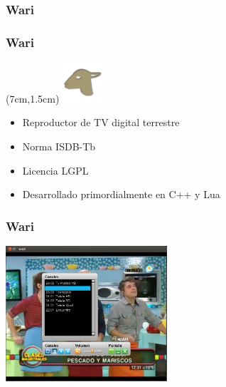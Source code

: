 \documentclass[a4paper,11pt]{beamer}
\begin{document}
		\subsubsection{Wari}
			\begin{frame}
				\frametitle{Wari}
				\begin{textblock*}{5cm}(7cm,1.5cm) %
					\includegraphics[width=1.5cm]{logo_wari.png}
				\end{textblock*}
				\begin{itemize}
					\item Reproductor de TV digital terrestre
					\item Norma ISDB-Tb
					\item Licencia LGPL
					\item Desarrollado primordialmente en C++ y Lua
				\end{itemize}
			\end{frame}

			\begin{frame}
				\frametitle{Wari}
					\begin{center}
						\includegraphics[width=6cm]{screenshot_wari.png}
					\end{center}
			\end{frame}


\end{document}
